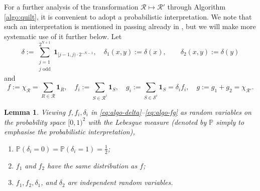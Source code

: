 \documentclass[11pt, reqno]{amsart}
\newtheorem{lemma}[theorem]{Lemma}
\theoremstyle{definition}
\theoremstyle{remark}
\numberwithin{equation}{section}
\renewcommand{\P}{\mathbb P}
\newcommand{\one}{\mathbf{1}}
\begin{document}
For a further analysis of the transformation $\mathscr R\mapsto\mathscr R'$ through Algorithm \ref{algo:quilt}, it is convenient to adopt a probabilistic interpretation.
We note that such an interpretation is mentioned in passing already in \cite[page 8]{Car}, but we will make more systematic use of it further below.
Let
\begin{equation}\label{eq:algo-delta}
  \delta:=\sum_{\substack{j=1 \\ j\text{ odd}}}^{2^{N+1}}\one_{[j-1,j)\cdot 2^{-N-1}},\quad
  \delta_1(x,y):=\delta(x),\qquad\delta_2(x,y):=\delta(y)
\end{equation}
and
\begin{equation}\label{eq:algo-fg}
  f:=\chi_{\mathscr R}=\sum_{R\in\mathscr R}\one_R,\quad
  f_i:=\sum_{S\in\mathscr R^i}\one_S,\quad
  g_i:=\sum_{S\in\mathscr S^i}\one_S=\delta_i f_i,\quad
  g:=g_1+g_2=\chi_{\mathscr R'}.
\end{equation}

\begin{lemma}\label{lem:indep}
Viewing $f,f_i,\delta_i$ in \eqref{eq:algo-delta}--\eqref{eq:algo-fg} as random variables on the probability space $[0,1)^2$ with the Lebesgue measure (denoted by $\P$ simply to emphasise the probabilistic interpretation),
\begin{enumerate}[\rm(1)]
  \item\label{it:Bernoulli} $\P(\delta_i=0)=\P(\delta_i=1)=\frac12$;
  \item\label{it:equidistr} $f_1$ and $f_2$ have the same distribution as $f$;
  \item\label{it:indep} $f_1,f_2,\delta_1$, and $\delta_2$ are independent random variables.
\end{enumerate}
\end{lemma}
\end{document}
